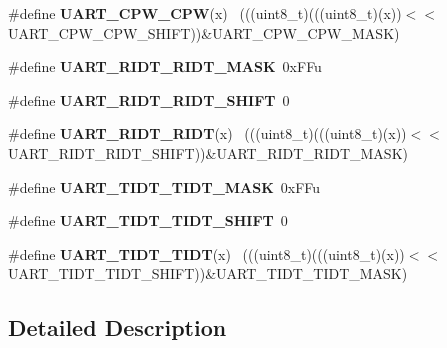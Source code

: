 \begin{DoxyCompactItemize}
\item 
\hypertarget{group___u_a_r_t___register___masks_ga7486367e5d2f343ddb48e8e863e4b466}{}\#define {\bfseries U\+A\+R\+T\+\_\+\+C\+P\+W\+\_\+\+C\+P\+W}(x)                                                ~(((uint8\+\_\+t)(((uint8\+\_\+t)(x))$<$$<$U\+A\+R\+T\+\_\+\+C\+P\+W\+\_\+\+C\+P\+W\+\_\+\+S\+H\+I\+F\+T))\&U\+A\+R\+T\+\_\+\+C\+P\+W\+\_\+\+C\+P\+W\+\_\+\+M\+A\+S\+K)\label{group___u_a_r_t___register___masks_ga7486367e5d2f343ddb48e8e863e4b466}

\item 
\hypertarget{group___u_a_r_t___register___masks_ga0fa99a128dbc76aa3d79d334b6da458f}{}\#define {\bfseries U\+A\+R\+T\+\_\+\+R\+I\+D\+T\+\_\+\+R\+I\+D\+T\+\_\+\+M\+A\+S\+K}~0x\+F\+Fu\label{group___u_a_r_t___register___masks_ga0fa99a128dbc76aa3d79d334b6da458f}

\item 
\hypertarget{group___u_a_r_t___register___masks_ga770411911fd2818d57d7625fef76428c}{}\#define {\bfseries U\+A\+R\+T\+\_\+\+R\+I\+D\+T\+\_\+\+R\+I\+D\+T\+\_\+\+S\+H\+I\+F\+T}~0\label{group___u_a_r_t___register___masks_ga770411911fd2818d57d7625fef76428c}

\item 
\hypertarget{group___u_a_r_t___register___masks_ga3217b6c57d15a197f593d1e60d6a838d}{}\#define {\bfseries U\+A\+R\+T\+\_\+\+R\+I\+D\+T\+\_\+\+R\+I\+D\+T}(x)                                            ~(((uint8\+\_\+t)(((uint8\+\_\+t)(x))$<$$<$U\+A\+R\+T\+\_\+\+R\+I\+D\+T\+\_\+\+R\+I\+D\+T\+\_\+\+S\+H\+I\+F\+T))\&U\+A\+R\+T\+\_\+\+R\+I\+D\+T\+\_\+\+R\+I\+D\+T\+\_\+\+M\+A\+S\+K)\label{group___u_a_r_t___register___masks_ga3217b6c57d15a197f593d1e60d6a838d}

\item 
\hypertarget{group___u_a_r_t___register___masks_ga816108ebaca4dbdb4ff8e4faa505b3ce}{}\#define {\bfseries U\+A\+R\+T\+\_\+\+T\+I\+D\+T\+\_\+\+T\+I\+D\+T\+\_\+\+M\+A\+S\+K}~0x\+F\+Fu\label{group___u_a_r_t___register___masks_ga816108ebaca4dbdb4ff8e4faa505b3ce}

\item 
\hypertarget{group___u_a_r_t___register___masks_ga3bfaf465a14ccac97e5e037b1d2cc476}{}\#define {\bfseries U\+A\+R\+T\+\_\+\+T\+I\+D\+T\+\_\+\+T\+I\+D\+T\+\_\+\+S\+H\+I\+F\+T}~0\label{group___u_a_r_t___register___masks_ga3bfaf465a14ccac97e5e037b1d2cc476}

\item 
\hypertarget{group___u_a_r_t___register___masks_gaeb63200040b5dd575bd3cb1e686afcd9}{}\#define {\bfseries U\+A\+R\+T\+\_\+\+T\+I\+D\+T\+\_\+\+T\+I\+D\+T}(x)                                            ~(((uint8\+\_\+t)(((uint8\+\_\+t)(x))$<$$<$U\+A\+R\+T\+\_\+\+T\+I\+D\+T\+\_\+\+T\+I\+D\+T\+\_\+\+S\+H\+I\+F\+T))\&U\+A\+R\+T\+\_\+\+T\+I\+D\+T\+\_\+\+T\+I\+D\+T\+\_\+\+M\+A\+S\+K)\label{group___u_a_r_t___register___masks_gaeb63200040b5dd575bd3cb1e686afcd9}

\end{DoxyCompactItemize}


\subsection{Detailed Description}
